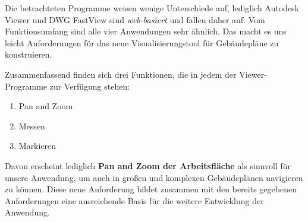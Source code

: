 Die betrachteten Programme weisen wenige Unterschiede auf, lediglich Autodesk Viewer und DWG FastView sind \textit{web-basiert} und fallen daher auf.
Vom Funktionsumfang sind alle vier Anwendungen sehr ähnlich.
Das macht es uns leicht Anforderungen für das neue Visualisierungstool für Gebäudepläne zu konstruieren.

Zusammenfassend finden sich drei Funktionen, die in jedem der Viewer-Programme zur Verfügung stehen:

\begin{enumerate}
    \item Pan and Zoom
    \item Messen
    \item Markieren
\end{enumerate}

Davon erscheint lediglich \textbf{Pan and Zoom der Arbeitsfläche} als sinnvoll für unsere Anwendung, um auch in großen und komplexen Gebäudeplänen navigieren zu können.
Diese neue Anforderung bildet zusammen mit den bereits gegebenen Anforderungen eine ausreichende Basis für die weitere Entwicklung der Anwendung.
